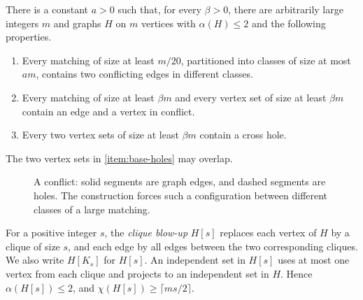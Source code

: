 \noindent\begin{minipage}{\linewidth}
\begin{theorem}\label{thm:base-graphs}
There is a constant \(a>0\) such that, for every \(\beta>0\),
there are arbitrarily large integers \(m\) and graphs \(H\) on
\(m\) vertices with \(\alpha(H)\le2\) and the following properties.
\begin{enumerate}[label=\textup{(G\arabic*)},ref=G\arabic*]
\item\label{item:base-colours}
Every matching of size at least \(m/20\), partitioned into classes
of size at most \(am\), contains two conflicting edges in different
classes.
\item\label{item:base-edge-point}
Every matching of size at least \(\beta m\) and every vertex set
of size at least \(\beta m\) contain an edge and a vertex in conflict.
\item\label{item:base-holes}
Every two vertex sets of size at least \(\beta m\) contain a cross
hole.
\end{enumerate}
The two vertex sets in \ref{item:base-holes} may overlap.
\end{theorem}
\end{minipage}\par

\begin{figure}[htbp]
\centering
{}
\caption{A conflict: solid segments are graph edges, and dashed
segments are holes. The construction forces such a configuration
between different classes of a large matching.}
\label{fig:four-holes}
\end{figure}

For a positive integer \(s\), the \emph{clique blow-up} \(H[s]\)
replaces each vertex of \(H\) by a clique of size \(s\), and each
edge by all edges between the two corresponding cliques.
We also write \(H[K_s]\) for \(H[s]\). An independent set in \(H[s]\) uses at most one vertex from each clique
and projects to an independent set in \(H\). Hence
\(\alpha(H[s])\le2\), and \(\chi(H[s])\ge\lceil ms/2\rceil\).

